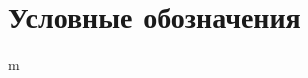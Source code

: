 \chapter*{Условные обозначения}
\ifdefined\BookVolume
  \label{ch:notation-floors}
\else
  \label{ch:notation}
\fi

\begingroup
\RenewDocumentCommand \gls { m } {  }
%
\par
\vspace{0.35em}

%
\par
\vspace{0.35em}
\endgroup
